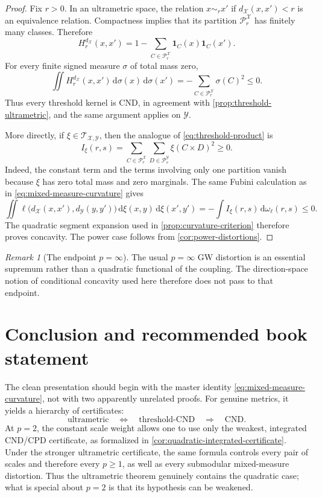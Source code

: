 \documentclass[11pt,a4paper]{article}
\theoremstyle{definition}
\theoremstyle{remark}
\newtheorem{remark}[theorem]{Remark}
\newcommand{\Tcal}{\mathcal T}
\newcommand{\dd}{\,\mathrm d}
\begin{document}
\begin{proof}
Fix \(r>0\).  In an ultrametric space, the relation
\(x\sim_r x'\) if \(d_{\mathcal X}(x,x')<r\) is an equivalence relation.
Compactness implies that its partition \(\mathscr P_r^{\mathcal X}\) has
finitely many classes.  Therefore
\[
  H_r^{d_{\mathcal X}}(x,x')
  =1-\sum_{C\in\mathscr P_r^{\mathcal X}}
  \mathbf 1_C(x)\mathbf 1_C(x').
\]
For every finite signed measure \(\sigma\) of total mass zero,
\[
  \iint H_r^{d_{\mathcal X}}(x,x')\dd\sigma(x)\dd\sigma(x')
  =-\sum_{C\in\mathscr P_r^{\mathcal X}}\sigma(C)^2\leq0.
\]
Thus every threshold kernel is CND, in agreement with
\cref{prop:threshold-ultrametric}, and the same argument applies on
\(\mathcal Y\).

More directly, if \(\xi\in\Tcal_{\mathcal X,\mathcal Y}\), then the analogue
of \eqref{eq:threshold-product} is
\begin{equation}
  I_\xi(r,s)
  =
  \sum_{C\in\mathscr P_r^{\mathcal X}}
  \sum_{D\in\mathscr P_s^{\mathcal Y}}
  \xi(C\times D)^2
  \geq0.
  \label{eq:ultrametric-squares}
\end{equation}
Indeed, the constant term and the terms involving only one partition vanish
because \(\xi\) has zero total mass and zero marginals.  The same Fubini
calculation as in \eqref{eq:mixed-measure-curvature} gives
\[
  \iint \ell\bigl(d_{\mathcal X}(x,x'),d_{\mathcal Y}(y,y')\bigr)
  \dd\xi(x,y)\dd\xi(x',y')
  =-\int I_\xi(r,s)\dd\omega_\ell(r,s)\leq0.
\]
The quadratic segment expansion used in \cref{prop:curvature-criterion}
therefore proves concavity.  The power case follows from
\cref{cor:power-distortions}.
\end{proof}

\begin{remark}[The endpoint \(p=\infty\)]
The usual \(p=\infty\) GW distortion is an essential supremum rather than a
quadratic functional of the coupling.  The direction-space notion of
conditional concavity used here therefore does not pass to that endpoint.
\end{remark}

\section{Conclusion and recommended book statement}
\label{sec:conclusion}

The clean presentation should begin with the master identity
\eqref{eq:mixed-measure-curvature}, not with two apparently unrelated proofs.
For genuine metrics, it yields a hierarchy of certificates:
\[
  \text{ultrametric}
  \quad\Longleftrightarrow\quad
  \text{threshold-CND}
  \quad\Longrightarrow\quad
  \text{CND}.
\]
At \(p=2\), the constant scale weight allows one to use only the weakest,
integrated CND/CPD certificate, as formalized in
\cref{cor:quadratic-integrated-certificate}.  Under the stronger ultrametric
certificate, the same formula controls every pair of scales and therefore
every \(p\geq1\), as well as every submodular mixed-measure distortion.  Thus
the ultrametric theorem genuinely contains the quadratic case; what is special
about \(p=2\) is that its hypothesis can be weakened.
\end{document}
